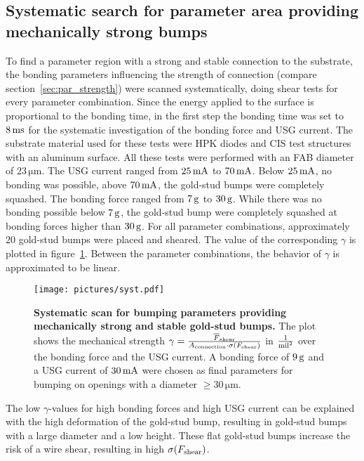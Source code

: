 \subsection{Systematic search for parameter area providing mechanically strong bumps}\label{sec:mechanical_strength_optimization}
To find a parameter region with a strong and stable connection to the substrate, the bonding parameters influencing the strength of connection (compare section~\ref{sec:par_strength}) were scanned systematically, doing shear tests for every parameter combination. Since the energy applied to the surface is proportional to the bonding time, in the first step the bonding time was set to $8\,\rm{ms}$ for the systematic investigation of the bonding force and \ac{USG} current. The substrate material used for these tests were \ac{HPK} diodes and CIS test structures with an aluminum surface. All these tests were performed with an \ac{FAB} diameter of $23\,\si{\micro \meter}$. The \ac{USG} current ranged from $25\,\rm{mA}$ to $70\,\rm{mA}$. Below $25\,\rm{mA}$, no bonding was possible, above $70\,\rm{mA}$, the gold-stud bumps were completely squashed. The bonding force ranged from $7\,\rm{g}$ to $30\,\rm{g}$. While there was no bonding possible below $7\,\rm{g}$, the gold-stud bump were completely squashed at bonding forces higher than $30\,\rm{g}$. For all parameter combinations, approximately~$20$ gold-stud bumps were placed and sheared. The value of the corresponding $\gamma$ is plotted in figure~\ref{plot:syst}. Between the parameter combinations, the behavior of $\gamma$ is approximated to be linear.
\begin{figure}
\begin{center}
\texttt{[image: pictures/syst.pdf]}
\end{center}
\caption[Systematic scan for bumping parameters providing mechanically strong and stable gold-stud bumps]{\textbf{Systematic scan for bumping parameters providing mechanically strong and stable gold-stud bumps.} The plot shows the mechanical strength $\gamma = \frac{\overline{F}_{\rm{shear}}}{A_{\rm{connection}} \cdot \sigma \left( F_{\rm{shear}}\right) }$ in $\frac{1}{\rm{mil}^2}$ over the bonding force and the \ac{USG} current. A bonding force of $9\,\rm{g}$ and a \ac{USG} current of $30\,\rm{mA}$ were chosen as final parameters for bumping on openings with a diameter $\ge 30\,\si{\micro \meter}$.}\label{plot:syst}
\end{figure}

The low $\gamma$-values for high bonding forces and high \ac{USG} current can be explained with the high deformation of the gold-stud bump, resulting in gold-stud bumps with a large diameter and a low height. These flat gold-stud bumps increase the risk of a wire shear, resulting in high $\sigma(F_{\rm{shear}})$.

